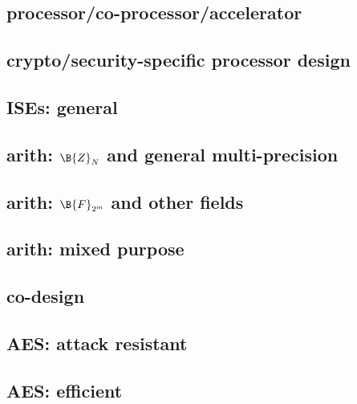 
\subsection*{processor/co-processor/accelerator}
\cite{SCARV:Gutmann:00}
\cite{SCARV:WuWeaAus:01}
\cite{SCARV:TheSisPne:09}
\cite{SCARV:MTRGS:99}
\cite{SCARV:GGHJPTW:11}

\subsection*{crypto/security-specific processor design}
\cite{SCARV:KocSavGro:08,SCARV:TilKirSze:10,SCARV:NREAMM:12,SCARV:YumSav:15,SCARV:RagAmbPar:15,SCARV:AweAus:17,SCARV:YHEF:18}

\subsection*{ISEs: general}
\cite{SCARV:BarGioMar:09}
\cite{SCARV:RegIen:16}
\cite{SCARV:FazLopOli:18}

\subsection*{arith: $\B{Z}_{N}$ and general multi-precision}
\cite{SCARV:Gro:02,SCARV:GroKam:03:a,SCARV:GAST:05,SCARV:GroTilSze:07}
\subsection*{arith: $\B{F}_{2^m}$ and other fields}
\cite{SCARV:GroKam:03:b,SCARV:FisLee:04,SCARV:GKP:04}
\subsection*{arith: mixed purpose}
\cite{SCARV:GroSav:04}

\subsection*{co-design}
\cite{SCARV:KLWGSTW:06,SCARV:GIPTV:06}

\subsection*{AES: attack resistant}
\cite{SCARV:TilGro:07:a}
\subsection*{AES: efficient}
\cite{SCARV:TilGroSze:05,SCARV:TilGro:06,SCARV:APRJ:11}
